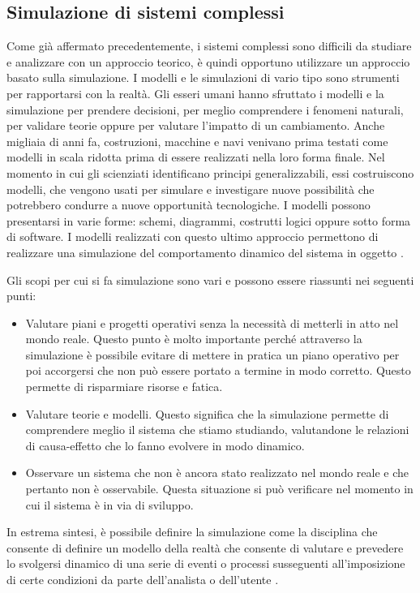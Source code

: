 \documentclass[11pt]{article}
\begin{document}
\subsection{Simulazione di sistemi complessi}
Come già affermato precedentemente, i sistemi complessi sono difficili da studiare e analizzare con un approccio teorico, è quindi opportuno utilizzare un approccio basato sulla simulazione. I modelli e le simulazioni di vario tipo sono strumenti per rapportarsi con la realtà. Gli esseri umani hanno sfruttato i modelli e la simulazione per prendere decisioni, per meglio comprendere i fenomeni naturali, per validare teorie oppure per valutare l'impatto di un cambiamento. Anche migliaia di anni fa, costruzioni, macchine e navi venivano prima testati come modelli in scala ridotta prima di essere realizzati nella loro forma finale. Nel momento in cui gli scienziati identificano principi generalizzabili, essi costruiscono modelli, che vengono usati per simulare e investigare nuove possibilità che potrebbero condurre a nuove opportunità tecnologiche. I modelli possono presentarsi in varie forme: schemi, diagrammi, costrutti logici oppure sotto forma di software. I modelli realizzati con questo ultimo approccio permettono di realizzare una simulazione del comportamento dinamico del sistema in oggetto \cite{ModelingAndSimulation}.

Gli scopi per cui si fa simulazione sono vari e possono essere riassunti nei seguenti punti:
\begin{itemize}
    \item Valutare piani e progetti operativi senza la necessità di metterli in atto nel mondo reale. Questo punto è molto importante perché attraverso la simulazione è possibile evitare di mettere in pratica un piano operativo per poi accorgersi che non può essere portato a termine in modo corretto. Questo permette di risparmiare risorse e fatica.
    \item Valutare teorie e modelli. Questo significa che la simulazione permette di comprendere meglio il sistema che stiamo studiando, valutandone le relazioni di causa-effetto che lo fanno evolvere in modo dinamico.
    \item Osservare un sistema che non è ancora stato realizzato nel mondo reale e che pertanto non è osservabile. Questa situazione si può verificare nel momento in cui il sistema è in via di sviluppo.
\end{itemize}
In estrema sintesi, è possibile definire la simulazione come la disciplina che consente di definire un modello della realtà che consente di valutare e prevedere lo svolgersi dinamico di una serie di eventi o processi susseguenti all'imposizione di certe condizioni da parte dell'analista o dell'utente \cite{WikiSimulazione}.
\end{document}
